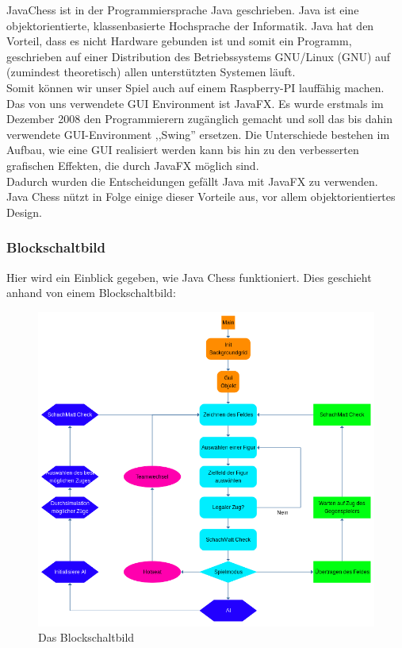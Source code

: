 \documentclass[12pt,a4paper]{article}
\begin{document}
{JavaChess ist in der Programmiersprache Java geschrieben. Java ist eine objektorientierte, klassenbasierte Hochsprache der Informatik. Java hat den Vorteil, dass es nicht Hardware gebunden ist und somit ein Programm, geschrieben auf einer Distribution des Betriebssystems GNU/Linux (\ac{GNU}) auf (zumindest theoretisch) allen unterstützten Systemen läuft. \\
Somit können wir unser Spiel auch auf einem Raspberry-PI lauffähig machen. \\
Das von uns verwendete \ac{GUI} Environment ist JavaFX. Es wurde erstmals im Dezember 2008 den Programmierern zugänglich gemacht und soll das bis dahin verwendete GUI-Environment ,,Swing'' ersetzen. Die Unterschiede bestehen im Aufbau, wie eine GUI realisiert werden kann bis hin zu den verbesserten grafischen Effekten, die durch JavaFX möglich sind. \\[1ex]
Dadurch wurden die Entscheidungen gefällt Java mit JavaFX zu verwenden.\\
Java Chess nützt in Folge einige dieser Vorteile aus, vor allem objektorientiertes Design. 


\subsubsection{Blockschaltbild}
\label{SUBSUBSEC:BLOCKSCHALTBILD}

Hier wird ein Einblick gegeben, wie Java Chess funktioniert. Dies geschieht anhand von einem Blockschaltbild: \\
\vspace{1cm}


\begin{figure}[H]
  \centering
   	\includegraphics[width=14cm]{graphics/block.png}
  \caption{Das Blockschaltbild}
  \label{fig:block}
\end{figure}

}
\end{document}
